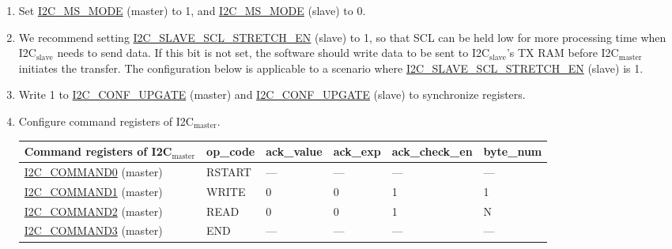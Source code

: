 \documentclass[main\_\_EN.tex]{subfiles}
\begin{document}
\begin{enumerate}
\item Set \hyperref[fielddesc:I2CMSMODE]{I2C\_MS\_MODE} (master) to 1, and \hyperref[fielddesc:I2CMSMODE]{I2C\_MS\_MODE} (slave) to 0.
\item We recommend setting \hyperref[fielddesc:I2CSLAVESCLSTRETCHEN]{I2C\_SLAVE\_SCL\_STRETCH\_EN} (slave) to 1, so that SCL can be held low for more processing time when I2C$_\text{slave}$ needs to send data. If this bit is not set, the software should write data to be sent to I2C$_\text{slave}$'s TX RAM before I2C$_\text{master}$ initiates the transfer. The configuration below is applicable to a scenario where \hyperref[fielddesc:I2CSLAVESCLSTRETCHEN]{I2C\_SLAVE\_SCL\_STRETCH\_EN} (slave) is 1.
\item Write 1 to \hyperref[fielddesc:I2CCONFUPGATE]{I2C\_CONF\_UPGATE} (master) and \hyperref[fielddesc:I2CCONFUPGATE]{I2C\_CONF\_UPGATE} (slave) to synchronize registers.
\item Configure command registers of I2C$_\text{master}$.

\begin{longtable}{ | p{5cm} | p{1.5cm} | p{1.5cm} | p{1.5cm} |p{2.5cm} | p{1.5cm} |}
\hline\rowcolor{lightgray}
Command registers of I2C$_\text{master}$& op\_code & ack\_value&ack\_exp&ack\_check\_en&byte\_num  \\ \hline
\hyperref[fielddesc:I2CCOMMAND0]{I2C\_COMMAND0} (master)& RSTART& ---&---&---&---  \\ \hline
\hyperref[fielddesc:I2CCOMMAND1]{I2C\_COMMAND1} (master)& WRITE& 0&0&1&1  \\ \hline
\hyperref[fielddesc:I2CCOMMAND2]{I2C\_COMMAND2} (master)& READ& 0&0&1&N  \\ \hline
\hyperref[fielddesc:I2CCOMMAND3]{I2C\_COMMAND3} (master)& END& ---&---&---&---  \\ \hline
\end{longtable}


\end{enumerate}
\end{document}
